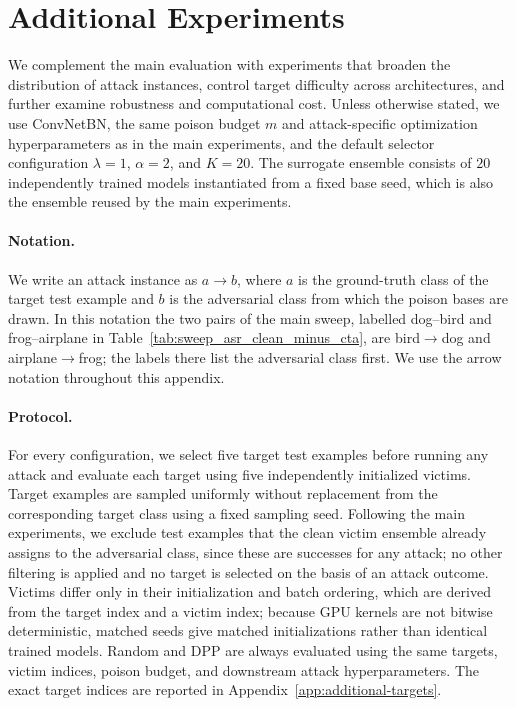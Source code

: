 
\section{Additional Experiments}
\label{sec:additional-experiments}

We complement the main evaluation with experiments that broaden the
distribution of attack instances, control target difficulty across
architectures, and further examine robustness and computational cost.
Unless otherwise stated, we use ConvNetBN, the same poison budget $m$
and attack-specific optimization hyperparameters as in the main
experiments, and the default selector configuration
$\lambda=1$, $\alpha=2$, and $K=20$. The surrogate ensemble consists of
$20$ independently trained models instantiated from a fixed base seed,
which is also the ensemble reused by the main experiments.

\paragraph{Notation.} We write an attack instance as
$a\!\rightarrow\!b$, where $a$ is the ground-truth class of the target
test example and $b$ is the adversarial class from which the poison
bases are drawn. In this notation the two pairs of the main sweep,
labelled dog--bird and frog--airplane in
Table~\ref{tab:sweep_asr_clean_minus_cta}, are
bird$\rightarrow$dog and airplane$\rightarrow$frog; the labels there
list the adversarial class first. We use the arrow notation throughout
this appendix.

\paragraph{Protocol.} For every configuration, we select five target
test examples before running any attack and evaluate each target using
five independently initialized victims. Target examples are sampled
uniformly without replacement from the corresponding target class using
a fixed sampling seed. Following the main experiments, we exclude test
examples that the clean victim ensemble already assigns to the
adversarial class, since these are successes for any attack; no other
filtering is applied and no target is selected on the basis of an attack
outcome. Victims differ only in their initialization and batch ordering,
which are derived from the target index and a victim index; because
GPU kernels are not bitwise deterministic, matched seeds give matched
initializations rather than identical trained models. Random and DPP are
always evaluated using the same targets, victim indices, poison budget,
and downstream attack hyperparameters. The exact target indices are
reported in Appendix~\ref{app:additional-targets}.

